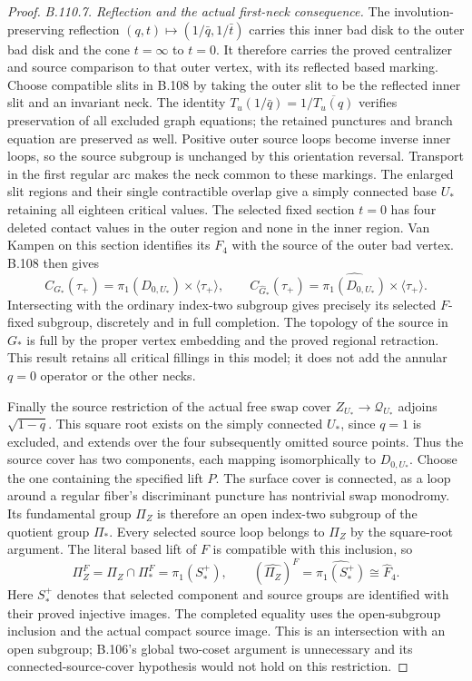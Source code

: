 \begin{proof}
\emph{B.110.7. Reflection and the actual first-neck consequence.}
The involution-preserving reflection
$(q,t)\mapsto(1/\bar q,1/\bar t)$ carries this inner bad disk to
the outer bad disk and the cone $t=\infty$ to $t=0$. It therefore
carries the proved centralizer and source comparison to that outer
vertex, with its reflected based marking. Choose compatible slits
in B.108 by taking the outer slit to be the reflected inner slit
and an invariant neck. The identity
$T_u(1/\bar q)=1/\overline{T_u(q)}$ verifies preservation of all
excluded graph equations; the retained punctures and branch equation
are preserved as well. Positive outer source loops become inverse
inner loops, so the source subgroup is unchanged by this orientation
reversal. Transport in the first regular arc makes the neck common
to these markings. The enlarged slit regions and their single
contractible overlap give a simply connected base $U_*$ retaining
all eighteen critical values. The selected fixed section $t=0$
has four deleted contact values in the outer region and none in
the inner region. Van Kampen on this section identifies its $F_4$
with the source of the outer bad vertex. B.108 then gives
\[
 C_{G_*}(\tau_+)=\pi_1(D_{0,U_*})\times\langle\tau_+\rangle,
 \qquad
 C_{\widehat G_*}(\tau_+)
   =\widehat{\pi_1(D_{0,U_*})}\times\langle\tau_+\rangle.
\]
Intersecting with the ordinary index-two subgroup gives precisely
its selected $F$-fixed subgroup, discretely and in full completion.
The topology of the source in $G_*$ is full by the proper vertex
embedding and the proved regional retraction. This result retains
all critical fillings in this model; it does not add the annular
$q=0$ operator or the other necks.

Finally the source restriction of the actual free swap cover
$Z_{U_*}\to\mathscr Q_{U_*}$ adjoins $\sqrt{1-q}$. This square
root exists on the simply connected $U_*$, since $q=1$ is excluded,
and extends over the four subsequently omitted source points.
Thus the source cover has two components, each mapping isomorphically
to $D_{0,U_*}$. Choose the one containing the specified lift $P$.
The surface cover is connected, as a loop around a regular fiber's
discriminant puncture has nontrivial swap monodromy. Its fundamental
group $\Pi_Z$ is therefore an open index-two subgroup of the quotient
group $\Pi_*$. Every selected source loop belongs to $\Pi_Z$ by
the square-root argument. The literal based lift of $F$ is compatible
with this inclusion, so
\[
 \Pi_Z^F=\Pi_Z\cap\Pi_*^F=\pi_1(S_*^+),\qquad
 (\widehat{\Pi_Z})^F=\widehat{\pi_1(S_*^+)}\cong\widehat F_4.
\]
Here $S_*^+$ denotes that selected component and source groups are
identified with their proved injective images. The completed equality
uses the open-subgroup inclusion and the actual compact source image.
This is an intersection with an open subgroup; B.106's global two-coset
argument is unnecessary and its connected-source-cover hypothesis
would not hold on this restriction.


\end{proof}
